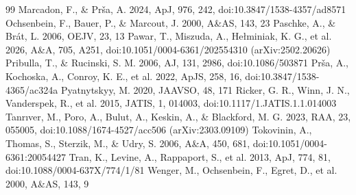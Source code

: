 \documentclass{aa}
\begin{document}
\begin{thebibliography}{99}
 Marcadon, F., \& Prša, A. 2024, ApJ, 976, 242, doi:10.3847/1538-4357/ad8571
 Ochsenbein, F., Bauer, P., \& Marcout, J. 2000, A\&AS, 143, 23
 Paschke, A., \& Brát, L. 2006, OEJV, 23, 13
 Pawar, T., Miszuda, A., Hełminiak, K. G., et al. 2026, A\&A, 705, A251, doi:10.1051/0004-6361/202554310 (arXiv:2502.20626)
 Pribulla, T., \& Rucinski, S. M. 2006, AJ, 131, 2986, doi:10.1086/503871
 Prša, A., Kochoska, A., Conroy, K. E., et al. 2022, ApJS, 258, 16, doi:10.3847/1538-4365/ac324a
 Pyatnytskyy, M. 2020, JAAVSO, 48, 171
 Ricker, G. R., Winn, J. N., Vanderspek, R., et al. 2015, JATIS, 1, 014003, doi:10.1117/1.JATIS.1.1.014003
 Tanrıver, M., Poro, A., Bulut, A., Keskin, A., \& Blackford, M. G. 2023, RAA, 23, 055005, doi:10.1088/1674-4527/acc506 (arXiv:2303.09109)
 Tokovinin, A., Thomas, S., Sterzik, M., \& Udry, S. 2006, A\&A, 450, 681, doi:10.1051/0004-6361:20054427
 Tran, K., Levine, A., Rappaport, S., et al. 2013, ApJ, 774, 81, doi:10.1088/0004-637X/774/1/81
 Wenger, M., Ochsenbein, F., Egret, D., et al. 2000, A\&AS, 143, 9
\end{thebibliography}
\end{document}
